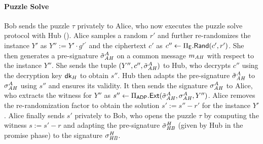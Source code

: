 

\paragraph{Puzzle Solve}
Bob sends the puzzle $\tau$ privately to Alice, who now executes the puzzle solve protocol with Hub 
().
Alice samples a random $r'$ and further re-randomizes the instance $Y'$ as $Y'' := Y' \cdot g^{r'}$ and the ciphertext $c'$ as $c'' \gets \Pi_{\mathsf{E}}.\mathsf{Rand}(c', r')$. 
She then generates a pre-signature $\tilde{\sigma}_{\mathit{AH}}^A$ on a common message $m_{\mathit{AH}}$ with respect to the instance $Y''$. She sends the tuple $(Y'', c'', \tilde{\sigma}_{\mathit{AH}}^A)$ to Hub, who decrypts $c''$ using the decryption key $\mathsf{dk}_H$ to obtain $s''$. 
Hub then adapts the pre-signature $\tilde{\sigma}_{\mathit{AH}}^A$ to $ \sigma_{\mathit{AH}}^A$ using $s''$ and ensures its validity. It then sends the signature $\sigma_{\mathit{AH}}^A$ to Alice, who extracts the witness for $Y''$ as $ s'' \gets \Pi_{\mathsf{ADP}}.{\mathsf{Ext}}(\tilde{\sigma}_{\mathit{AH}}^A, \sigma_{\mathit{AH}}^A, Y'')$. 
Alice removes the re-randomization factor to obtain the solution $s' := s'' - r'$ for the instance $Y'$. Alice finally sends $s'$ privately to Bob, who opens the puzzle $\tau$ by computing the witness $s := s' - r$ and adapting the pre-signature $\tilde{\sigma}_{\mathit{HB}}^H$ (given by Hub in the promise phase) to the signature $\sigma_{\mathit{HB}}^H$.



